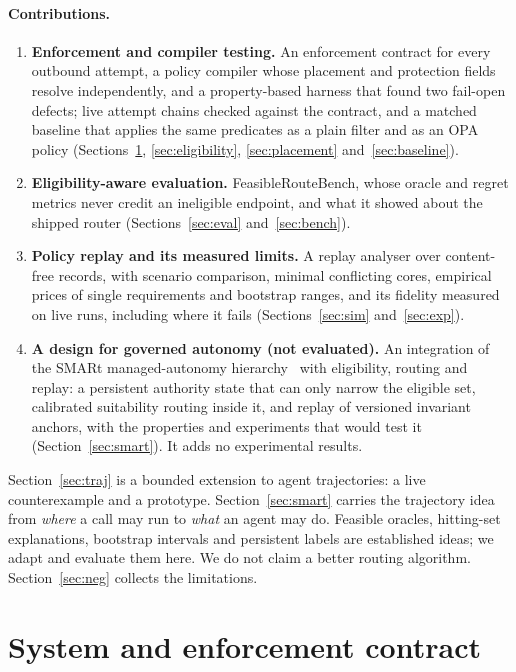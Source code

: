 \documentclass[11pt]{article}
\begin{document}
\paragraph{Contributions.}
\begin{enumerate}
  \item \textbf{Enforcement and compiler testing.} An enforcement contract for every outbound
    attempt, a policy compiler whose placement and protection fields resolve independently, and a
    property-based harness that found two fail-open defects; live attempt chains checked against
    the contract, and a matched baseline that applies the same predicates as a plain filter and
    as an OPA policy (Sections~\ref{sec:system}, \ref{sec:eligibility}, \ref{sec:placement}
    and~\ref{sec:baseline}).
  \item \textbf{Eligibility-aware evaluation.} FeasibleRouteBench, whose oracle and regret
    metrics never credit an ineligible endpoint, and what it showed about the shipped router
    (Sections~\ref{sec:eval} and~\ref{sec:bench}).
  \item \textbf{Policy replay and its measured limits.} A replay analyser over content-free
    records, with scenario comparison, minimal conflicting cores, empirical prices of single
    requirements and bootstrap ranges, and its fidelity measured on live runs, including where it
    fails (Sections~\ref{sec:sim} and~\ref{sec:exp}).
  \item \textbf{A design for governed autonomy (not evaluated).} An integration of the SMARt
    managed-autonomy hierarchy~\cite{smartma,smartbounded} with eligibility, routing and replay:
    a persistent authority state that can only narrow the eligible set, calibrated suitability
    routing inside it, and replay of versioned invariant anchors, with the properties and
    experiments that would test it (Section~\ref{sec:smart}). It adds no experimental results.
\end{enumerate}
Section~\ref{sec:traj} is a bounded extension to agent trajectories: a live counterexample and a
prototype. Section~\ref{sec:smart} carries the trajectory idea from \emph{where} a call may
run to \emph{what} an agent may do. Feasible oracles, hitting-set explanations, bootstrap intervals and persistent labels
are established ideas; we adapt and evaluate them here. We do not claim a better routing
algorithm. Section~\ref{sec:neg} collects the limitations.

\section{System and enforcement contract}
\label{sec:system}
\end{document}
